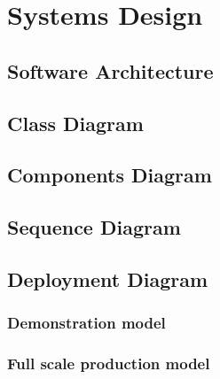 %
%
\chapter{Systems Design}

\section{Software Architecture}

\section{Class Diagram}

\section{Components Diagram}

\section{Sequence Diagram}

\section{Deployment Diagram}

\subsection{Demonstration model}

\subsection{Full scale production model}

\clearpage